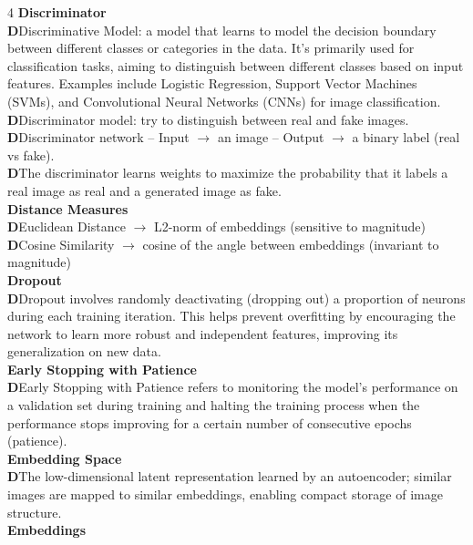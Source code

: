 \documentclass[8pt]{extarticle}
\newcommand{\dtag}{\textcolor{definitioncolor}{\tiny\textbf{D}}\;}
\begin{document}
\begin{multicols}{4}
\vspace{2pt}\textbf{Discriminator}\\
\dtag Discriminative Model: a model that learns to model the decision boundary between different classes or categories in the data. It's primarily used for classification tasks, aiming to distinguish between different classes based on input features. Examples include Logistic Regression, Support Vector Machines (SVMs), and Convolutional Neural Networks (CNNs) for image classification.\\
\dtag Discriminator model: try to distinguish between real and fake images.\\
\dtag Discriminator network -- Input $\rightarrow$ an image -- Output $\rightarrow$ a binary label (real vs fake).\\
\dtag The discriminator learns weights to maximize the probability that it labels a real image as real and a generated image as fake.\\
\vspace{2pt}\textbf{Distance Measures}\\
\dtag Euclidean Distance $\rightarrow$ L2-norm of embeddings (sensitive to magnitude)\\
\dtag Cosine Similarity $\rightarrow$ cosine of the angle between embeddings (invariant to magnitude)\\
\vspace{2pt}\textbf{Dropout}\\
\dtag Dropout involves randomly deactivating (dropping out) a proportion of neurons during each training iteration. This helps prevent overfitting by encouraging the network to learn more robust and independent features, improving its generalization on new data.\\
\vspace{2pt}\textbf{Early Stopping with Patience}\\
\dtag Early Stopping with Patience refers to monitoring the model's performance on a validation set during training and halting the training process when the performance stops improving for a certain number of consecutive epochs (patience).\\
\vspace{2pt}\textbf{Embedding Space}\\
\dtag The low-dimensional latent representation learned by an autoencoder; similar images are mapped to similar embeddings, enabling compact storage of image structure.\\
\vspace{2pt}\textbf{Embeddings}\\

\end{multicols}
\end{document}
